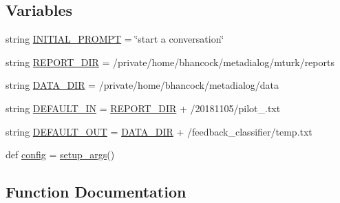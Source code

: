 \subsection*{Variables}
\begin{DoxyCompactItemize}
\item 
string \hyperlink{namespaceprojects_1_1self__feeding_1_1scripts_1_1convert__rated__to__polarized_acbe72fcc7004d0b80aa7f984320d8741}{I\+N\+I\+T\+I\+A\+L\+\_\+\+P\+R\+O\+M\+PT} = \char`\"{}start a conversation\char`\"{}
\item 
string \hyperlink{namespaceprojects_1_1self__feeding_1_1scripts_1_1convert__rated__to__polarized_aa061990e0372910406b820e7a04a6e8b}{R\+E\+P\+O\+R\+T\+\_\+\+D\+IR} = \textquotesingle{}/private/home/bhancock/metadialog/mturk/reports\textquotesingle{}
\item 
string \hyperlink{namespaceprojects_1_1self__feeding_1_1scripts_1_1convert__rated__to__polarized_abd0fb646bc71faac6a792758d3bb9511}{D\+A\+T\+A\+\_\+\+D\+IR} = \textquotesingle{}/private/home/bhancock/metadialog/data\textquotesingle{}
\item 
string \hyperlink{namespaceprojects_1_1self__feeding_1_1scripts_1_1convert__rated__to__polarized_a3cc97f8360251c0c93aebeef66dbdaae}{D\+E\+F\+A\+U\+L\+T\+\_\+\+IN} = \hyperlink{namespaceprojects_1_1self__feeding_1_1scripts_1_1convert__rated__to__polarized_aa061990e0372910406b820e7a04a6e8b}{R\+E\+P\+O\+R\+T\+\_\+\+D\+IR} + \textquotesingle{}/20181105/pilot\+\_.\+txt\textquotesingle{}
\item 
string \hyperlink{namespaceprojects_1_1self__feeding_1_1scripts_1_1convert__rated__to__polarized_a4eea690ec8641fee47b90c473377d0c6}{D\+E\+F\+A\+U\+L\+T\+\_\+\+O\+UT} = \hyperlink{namespaceprojects_1_1self__feeding_1_1scripts_1_1convert__rated__to__polarized_abd0fb646bc71faac6a792758d3bb9511}{D\+A\+T\+A\+\_\+\+D\+IR} + \textquotesingle{}/feedback\+\_\+classifier/temp.\+txt\textquotesingle{}
\item 
def \hyperlink{namespaceprojects_1_1self__feeding_1_1scripts_1_1convert__rated__to__polarized_aeadc1d5335ee2fb1b0c70decb82bc14f}{config} = \hyperlink{namespaceprojects_1_1self__feeding_1_1scripts_1_1convert__rated__to__polarized_acba2c1088cdc95f703203c9166b9499d}{setup\+\_\+args}()
\end{DoxyCompactItemize}


\subsection{Function Documentation}
\mbox{\label{namespaceprojects_1_1self__feeding_1_1scripts_1_1convert__rated__to__polarized_abb1b1c7522da8d4703fc74cdb6422d87}} 
